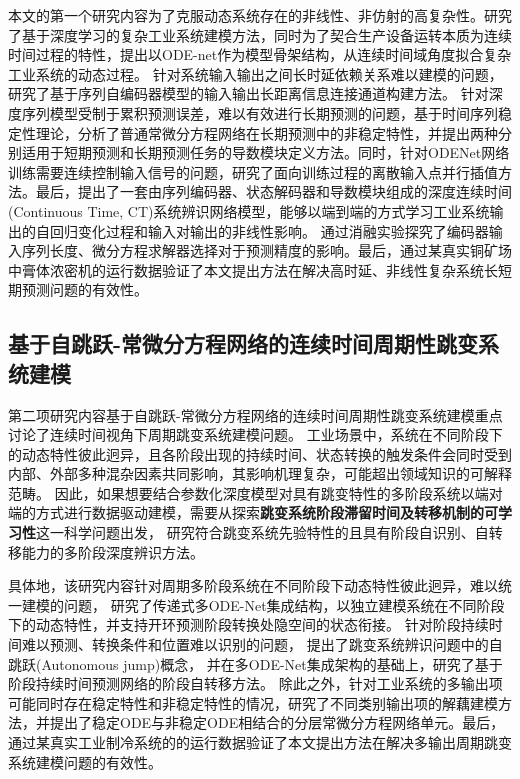 本文的第一个研究内容为了克服动态系统存在的非线性、非仿射的高复杂性。研究了基于深度学习的复杂工业系统建模方法，同时为了契合生产设备运转本质为连续时间过程的特性，提出以ODE-net作为模型骨架结构，从连续时间域角度拟合复杂工业系统的动态过程。
针对系统输入输出之间长时延依赖关系难以建模的问题，研究了基于序列自编码器模型的输入输出长距离信息连接通道构建方法。
针对深度序列模型受制于累积预测误差，难以有效进行长期预测的问题，基于时间序列稳定性理论，分析了普通常微分方程网络在长期预测中的非稳定特性，并提出两种分别适用于短期预测和长期预测任务的导数模块定义方法。同时，针对ODENet网络训练需要连续控制输入信号的问题，研究了面向训练过程的离散输入点并行插值方法。最后，提出了一套由序列编码器、状态解码器和导数模块组成的深度连续时间(Continuous Time, CT)系统辨识网络模型，能够以端到端的方式学习工业系统输出的自回归变化过程和输入对输出的非线性影响。
通过消融实验探究了编码器输入序列长度、微分方程求解器选择对于预测精度的影响。最后，通过某真实铜矿场中膏体浓密机的运行数据验证了本文提出方法在解决高时延、非线性复杂系统长短期预测问题的有效性。




\subsection{基于自跳跃-常微分方程网络的连续时间周期性跳变系统建模}


第二项研究内容基于自跳跃-常微分方程网络的连续时间周期性跳变系统建模重点讨论了连续时间视角下周期跳变系统建模问题。
工业场景中，系统在不同阶段下的动态特性彼此迥异，且各阶段出现的持续时间、状态转换的触发条件会同时受到内部、外部多种混杂因素共同影响，其影响机理复杂，可能超出领域知识的可解释范畴。
因此，如果想要结合参数化深度模型对具有跳变特性的多阶段系统以端对端的方式进行数据驱动建模，需要从探索\textbf{跳变系统阶段滞留时间及转移机制的可学习性}这一科学问题出发，
研究符合跳变系统先验特性的且具有阶段自识别、自转移能力的多阶段深度辨识方法。

具体地，该研究内容针对周期多阶段系统在不同阶段下动态特性彼此迥异，难以统一建模的问题，
研究了传递式多ODE-Net集成结构，以独立建模系统在不同阶段下的动态特性，并支持开环预测阶段转换处隐空间的状态衔接。
针对阶段持续时间难以预测、转换条件和位置难以识别的问题，
提出了跳变系统辨识问题中的自跳跃(Autonomous jump)概念，
并在多ODE-Net集成架构的基础上，研究了基于阶段持续时间预测网络的阶段自转移方法。
除此之外，针对工业系统的多输出项可能同时存在稳定特性和非稳定特性的情况，研究了不同类别输出项的解藕建模方法，并提出了稳定ODE与非稳定ODE相结合的分层常微分方程网络单元。最后，通过某真实工业制冷系统的的运行数据验证了本文提出方法在解决多输出周期跳变系统建模问题的有效性。


